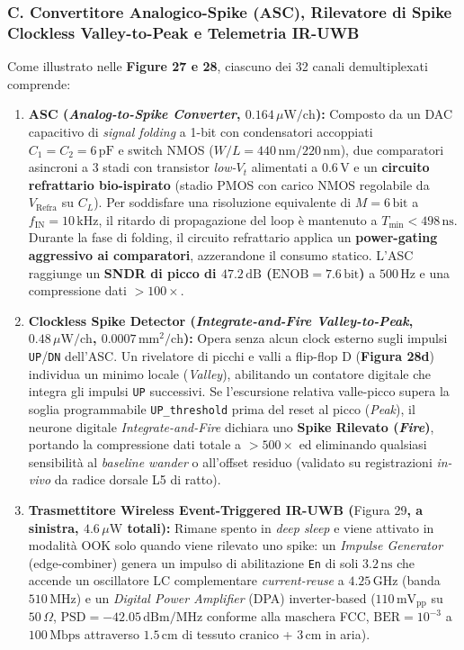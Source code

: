 \documentclass[11pt,a4paper]{article}
\begin{document}
\subsubsection{C. Convertitore Analogico-Spike (ASC), Rilevatore di Spike Clockless Valley-to-Peak e Telemetria IR-UWB}
Come illustrato nelle \textbf{Figure 27 e 28}, ciascuno dei 32 canali demultiplexati comprende:
\begin{enumerate}
  \item \textbf{ASC (\textit{Analog-to-Spike Converter}, $0.164\,\mu\text{W/ch}$):} Composto da un DAC capacitivo di \textit{signal folding} a 1-bit con condensatori accoppiati \textbf{$C_1 = C_2 = 6\,\text{pF}$} e switch NMOS ($W/L = 440\,\text{nm}/220\,\text{nm}$), due comparatori asincroni a 3 stadi con transistor \textit{low-$V_t$} alimentati a $0.6\,\text{V}$ e un \textbf{circuito refrattario bio-ispirato} (stadio PMOS con carico NMOS regolabile da $V_{\text{Refra}}$ su $C_L$). Per soddisfare una risoluzione equivalente di $M = 6\,\text{bit}$ a $f_{\text{IN}} = 10\,\text{kHz}$, il ritardo di propagazione del loop è mantenuto a $T_{\min} < 498\,\text{ns}$. Durante la fase di folding, il circuito refrattario applica un \textbf{power-gating aggressivo ai comparatori}, azzerandone il consumo statico. L'ASC raggiunge un \textbf{SNDR di picco di $47.2\,\text{dB}$ ($\text{ENOB} = 7.6\,\text{bit}$)} a $500\,\text{Hz}$ e una compressione dati \textbf{$>100\times$}.
  \item \textbf{Clockless Spike Detector (\textit{Integrate-and-Fire Valley-to-Peak}, $0.48\,\mu\text{W/ch}$, $0.0007\,\text{mm}^2/\text{ch}$):} Opera senza alcun clock esterno sugli impulsi \texttt{UP}/\texttt{DN} dell'ASC. Un rivelatore di picchi e valli a flip-flop D (\textbf{Figura 28d}) individua un minimo locale (\textit{Valley}), abilitando un contatore digitale che integra gli impulsi \texttt{UP} successivi. Se l'escursione relativa valle-picco supera la soglia programmabile \texttt{UP\_threshold} prima del reset al picco (\textit{Peak}), il neurone digitale \textit{Integrate-and-Fire} dichiara uno \textbf{Spike Rilevato (\textit{Fire})}, portando la compressione dati totale a \textbf{$>500\times$} ed eliminando qualsiasi sensibilità al \textit{baseline wander} o all'offset residuo (validato su registrazioni \textit{in-vivo} da radice dorsale L5 di ratto).
  \item \textbf{Trasmettitore Wireless Event-Triggered IR-UWB (}Figura 29\textbf{, a sinistra, $4.6\,\mu\text{W}$ totali):} Rimane spento in \textit{deep sleep} e viene attivato in modalità OOK solo quando viene rilevato uno spike: un \textit{Impulse Generator} (edge-combiner) genera un impulso di abilitazione \texttt{En} di soli \textbf{$3.2\,\text{ns}$} che accende un oscillatore LC complementare \textit{current-reuse} a \textbf{$4.25\,\text{GHz}$} (banda $510\,\text{MHz}$) e un \textit{Digital Power Amplifier} (DPA) inverter-based ($110\,\text{mV}_{\text{pp}}$ su $50\,\Omega$, $\text{PSD} = -42.05\,\text{dBm/MHz}$ conforme alla maschera FCC, $\text{BER} = 10^{-3}$ a $100\,\text{Mbps}$ attraverso $1.5\,\text{cm}$ di tessuto cranico + $3\,\text{cm}$ in aria).
\end{enumerate}
\end{document}
